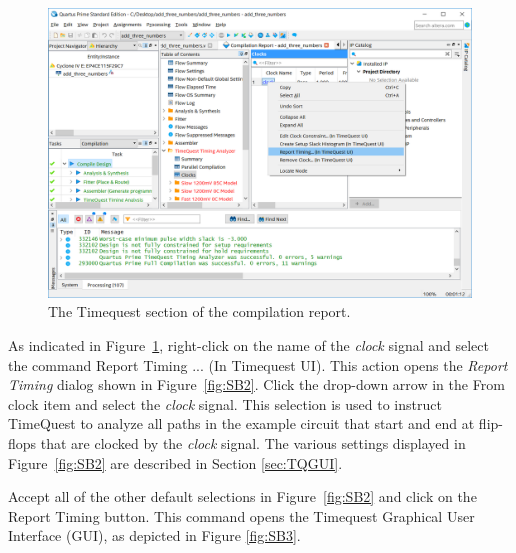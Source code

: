 \documentclass[11pt, twoside, pdftex]{article}
\begin{document}
\begin{figure}[H]
\begin{center}
\includegraphics[scale=0.5]{figures/SB1.png}
\end{center}
\caption{The Timequest section of the compilation report.}
\label{fig:SB1}
\end{figure}

As indicated in Figure~\ref{fig:SB1}, right-click on the name of the {\it clock} signal 
and select the command {\sf Report Timing ... (In Timequest UI)}. This action opens
the {\it Report Timing} dialog shown in Figure~\ref{fig:SB2}. Click the drop-down arrow
in the {\sf From clock} item and select the {\it clock} signal. This selection is used to
instruct TimeQuest to analyze all paths in the example circuit that start and end at
flip-flops that are clocked by the {\it clock} signal. The various settings displayed in 
Figure~\ref{fig:SB2} are described in Section \ref{sec:TQGUI}.

Accept all of the other default selections in Figure~\ref{fig:SB2} and click on 
the {\sf Report Timing} button. This command opens the Timequest Graphical User Interface
(GUI), as depicted in Figure \ref{fig:SB3}.
\end{document}
